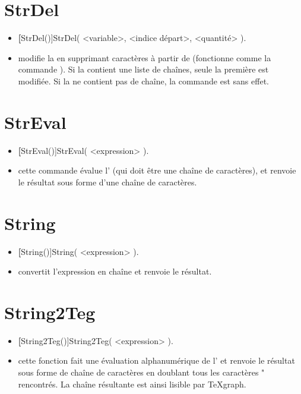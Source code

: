 \section{StrDel}\label{cmdStrDel}

\begin{itemize}
 \item \util \textbf[StrDel()]{StrDel( <variable>, <indice départ>, <quantité> )}.
 \item \desc modifie la  en supprimant  caractères à partir de  (fonctionne comme la commande ). Si la   contient une liste de chaînes, seule la première est modifiée. Si la  ne contient pas de chaîne, la commande est sans effet.
\end{itemize}

\section{StrEval}\label{cmdStrEval}

\begin{itemize}
 \item \util \textbf[StrEval()]{StrEval( <expression> )}.
 \item \desc cette commande évalue l' (qui doit être une chaîne de caractères), et renvoie le résultat sous forme d'une chaîne de caractères.
\end{itemize}

\section{String}\label{cmdString}

\begin{itemize}
 \item \util \textbf[String()]{String( <expression> )}.
 \item \desc convertit l'expression en chaîne et renvoie le résultat.
\end{itemize}

\section{String2Teg}\label{cmdString2Teg}

\begin{itemize}
 \item \util \textbf[String2Teg()]{String2Teg( <expression> )}.
 \item \desc cette fonction fait une évaluation alphanumérique de l' et renvoie le résultat sous forme de chaîne de caractères en doublant tous les caractères " rencontrés. La chaîne résultante est ainsi lisible par TeXgraph. 
\end{itemize}

